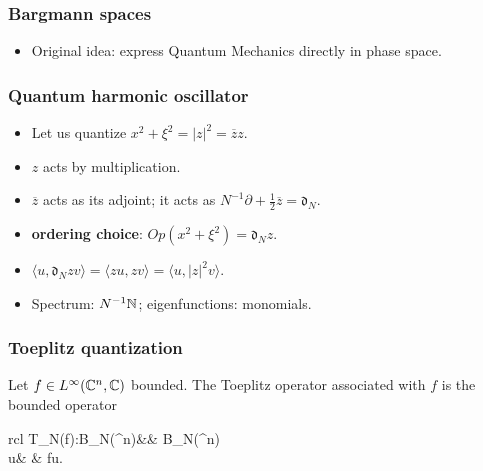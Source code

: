 \documentclass[mathserif]{beamer}
\begin{document}
\begin{frame}
  \frametitle{Bargmann spaces}
  \begin{itemize}
  \item Original idea: express Quantum Mechanics directly in phase
    space.
  \end{itemize}

\end{frame}

\begin{frame}
  \frametitle{Quantum harmonic oscillator}
  \begin{itemize}
  \item Let us quantize $x^2+\xi^2=|z|^2=\overline{z}z$.
  \item<2-> $z$ acts by multiplication.
  \item<3-> $\overline{z}$ acts as its adjoint; it acts as
    $N^{-1}\partial+\frac 12 \overline{z}=\mathfrak{d}_N$.
  \item<4-> {\bf ordering choice}: $Op(x^2+\xi^2)=\mathfrak{d}_Nz$.
  \item<5-> $\langle u,\mathfrak{d}_Nzv\rangle=\langle
    zu,zv\rangle=\langle u,|z|^2v\rangle$.
  \item<6> Spectrum: $N^{-1}\mathbb{N}$; eigenfunctions: monomials. \vspace{1em}
  \end{itemize}
\end{frame}

\begin{frame}
  \frametitle{Toeplitz quantization}
  Let $f\in L^{\infty}(\mathbb{C}^n,\mathbb{C})$ bounded. The Toeplitz operator associated
  with $f$ is the bounded operator
\begin{center}
\begin{array}{rcl}
 		T_N(f):B_N(\C^n)&\to & B_N(\C^n)\\
		u& \mapsto& fu\uncover<2->{)}.
 		\end{array}
\end{center}

\end{frame}
\end{document}
